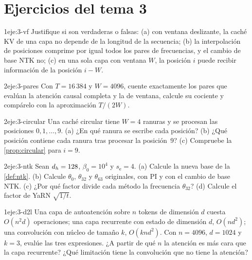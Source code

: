 \section*{Ejercicios del tema 3}

\begin{ejercicio}{1}{eje:3-vf}
Justifique si son verdaderas o falsas: (a) con ventana deslizante, la caché KV de una capa no depende de la longitud de la secuencia; (b) la interpolación de posiciones comprime por igual todos los pares de frecuencias, y el cambio de base NTK no; (c) en una sola capa con ventana $W$, la posición $i$ puede recibir información de la posición $i-W$.
\end{ejercicio}

\begin{ejercicio}{2}{eje:3-pares}
Con $T=16\,384$ y $W=4096$, cuente exactamente los pares que evalúan la atención causal completa y la de ventana, calcule su cociente y compárelo con la aproximación $T/(2W)$.
\end{ejercicio}

\begin{ejercicio}{2}{eje:3-circular}
Una caché circular tiene $W=4$ ranuras y se procesan las posiciones $0,1,\dots,9$. (a) ¿En qué ranura se escribe cada posición? (b) ¿Qué posición contiene cada ranura tras procesar la posición~9? (c) Compruebe la \cref{prop:circular} para $i=9$.
\end{ejercicio}

\begin{ejercicio}{2}{eje:3-ntk}
Sean $d_{h}=128$, $\beta_0=10^{4}$ y $s_{\mathrm{e}}=4$. (a) Calcule la nueva base de la \cref{def:ntk}. (b) Calcule $\theta_0$, $\theta_{32}$ y $\theta_{63}$ originales, con PI y con el cambio de base NTK. (c) ¿Por qué factor divide cada método la frecuencia $\theta_{32}$? (d) Calcule el factor de YaRN $\sqrt{1/t}$.
\end{ejercicio}

\begin{ejercicio}{1}{eje:3-d2l}
Una capa de autoatención sobre $n$ tokens de dimensión $d$ cuesta $O(n^{2}d)$ operaciones; una capa recurrente con estado de dimensión $d$, $O(nd^{2})$; una convolución con núcleo de tamaño $k$, $O(knd^{2})$. Con $n=4096$, $d=1024$ y $k=3$, evalúe las tres expresiones. ¿A partir de qué $n$ la atención es más cara que la capa recurrente? ¿Qué limitación tiene la convolución que no tiene la atención?
\end{ejercicio}

